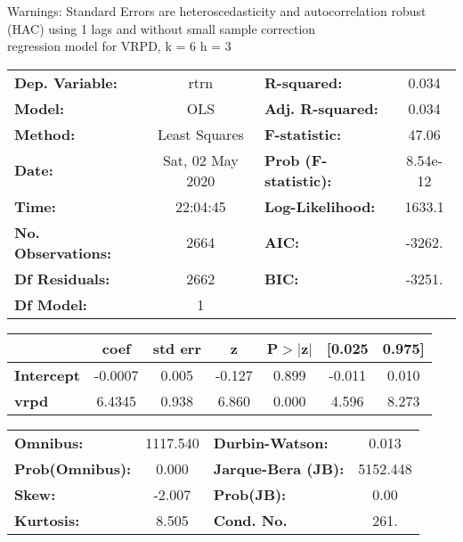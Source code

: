 Warnings: \newline
 [1] Standard Errors are heteroscedasticity and autocorrelation robust (HAC) using 1 lags and without small sample correction\\ 

regression model for VRPD, k = 6 h = 3\begin{center}
\begin{tabular}{lclc}
\toprule
\textbf{Dep. Variable:}    &       rtrn       & \textbf{  R-squared:         } &     0.034   \\
\textbf{Model:}            &       OLS        & \textbf{  Adj. R-squared:    } &     0.034   \\
\textbf{Method:}           &  Least Squares   & \textbf{  F-statistic:       } &     47.06   \\
\textbf{Date:}             & Sat, 02 May 2020 & \textbf{  Prob (F-statistic):} &  8.54e-12   \\
\textbf{Time:}             &     22:04:45     & \textbf{  Log-Likelihood:    } &    1633.1   \\
\textbf{No. Observations:} &        2664      & \textbf{  AIC:               } &    -3262.   \\
\textbf{Df Residuals:}     &        2662      & \textbf{  BIC:               } &    -3251.   \\
\textbf{Df Model:}         &           1      & \textbf{                     } &             \\
\bottomrule
\end{tabular}
\begin{tabular}{lcccccc}
                   & \textbf{coef} & \textbf{std err} & \textbf{z} & \textbf{P$> |$z$|$} & \textbf{[0.025} & \textbf{0.975]}  \\
\midrule
\textbf{Intercept} &      -0.0007  &        0.005     &    -0.127  &         0.899        &       -0.011    &        0.010     \\
\textbf{vrpd}      &       6.4345  &        0.938     &     6.860  &         0.000        &        4.596    &        8.273     \\
\bottomrule
\end{tabular}
\begin{tabular}{lclc}
\textbf{Omnibus:}       & 1117.540 & \textbf{  Durbin-Watson:     } &    0.013  \\
\textbf{Prob(Omnibus):} &   0.000  & \textbf{  Jarque-Bera (JB):  } & 5152.448  \\
\textbf{Skew:}          &  -2.007  & \textbf{  Prob(JB):          } &     0.00  \\
\textbf{Kurtosis:}      &   8.505  & \textbf{  Cond. No.          } &     261.  \\
\bottomrule
\end{tabular}
\end{center}

